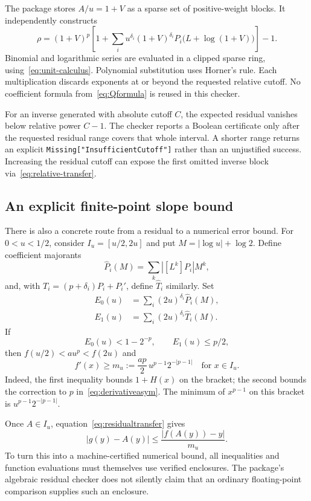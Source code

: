 \documentclass[11pt,a4paper]{article}
\numberwithin{equation}{section}
\theoremstyle{definition}
\theoremstyle{remark}
\newcommand{\code}[1]{\texttt{#1}}
\begin{document}
The package stores $A/u=1+V$ as a sparse set of positive-weight blocks.
It independently constructs
\begin{equation}\label{eq:checker}
 \rho=(1+V)^p\left[1+\sum_i u^{\delta_i}(1+V)^{\delta_i}
 P_i\bigl(L+\log(1+V)\bigr)\right]-1.
\end{equation}
Binomial and logarithmic series are evaluated in a clipped sparse ring,
using~\eqref{eq:unit-calculus}. Polynomial substitution uses Horner's rule.
Each multiplication discards exponents at or beyond the requested relative
cutoff. No coefficient formula from~\eqref{eq:Qformula} is reused in this
checker.

For an inverse generated with absolute cutoff $C$, the expected residual
vanishes below relative power $C-1$. The checker reports a Boolean
certificate only after the requested residual range covers that whole
interval. A shorter range returns an explicit
\code{Missing["InsufficientCutoff"]} rather than an unjustified success.
Increasing the residual cutoff can expose the first omitted inverse block
via~\eqref{eq:relative-transfer}.

\subsection{An explicit finite-point slope bound}

There is also a concrete route from a residual to a numerical error bound.
For $0<u<1/2$, consider $I_u=[u/2,2u]$ and put
$M=|\log u|+\log2$. Define coefficient majorants
\[
 \widehat P_i(M)=\sum_k |[L^k]P_i|M^k,
\]
and, with $T_i=(p+\delta_i)P_i+P_i'$, define $\widehat T_i$ similarly.
Set
\begin{align*}
 E_0(u)&=\sum_i(2u)^{\delta_i}\widehat P_i(M),\\
 E_1(u)&=\sum_i(2u)^{\delta_i}\widehat T_i(M).
\end{align*}
If
\[
 E_0(u)<1-2^{-p},\qquad E_1(u)\le p/2,
\]
then $f(u/2)<a u^p<f(2u)$ and
\begin{equation}\label{eq:explicit-slope}
 f'(x)\ge m_u:=\frac{ap}{2}\,u^{p-1}2^{-|p-1|}
 \quad\text{for }x\in I_u.
\end{equation}
Indeed, the first inequality bounds $1+H(x)$ on the bracket; the second
bounds the correction to $p$ in~\eqref{eq:derivativeasym}. The minimum of
$x^{p-1}$ on this bracket is $u^{p-1}2^{-|p-1|}$.

Once $A\in I_u$, equation~\eqref{eq:residualtransfer} gives
\begin{equation}\label{eq:finitebound}
 |g(y)-A(y)|\le\frac{|f(A(y))-y|}{m_u}.
\end{equation}
To turn this into a machine-certified numerical bound, all inequalities
and function evaluations must themselves use verified enclosures. The
package's algebraic residual checker does not silently claim that an
ordinary floating-point comparison supplies such an enclosure.
\end{document}
